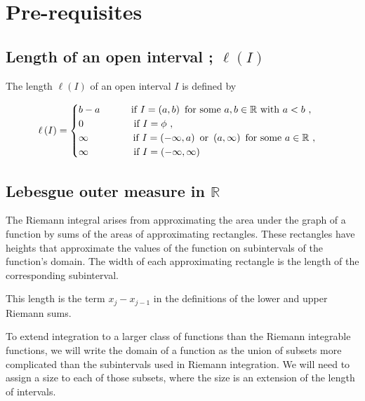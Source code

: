 \documentclass[12pt, a4paper]{article} %
\begin{document}
    \section{Pre-requisites}

       \subsection{Length of an open interval ; $\ell \left(I\right)$}
           The length $\ell\left(I\right)$ of an open interval $I$ is defined by
           
           \begin{equation*}
            \ell\left(I\right) = \begin{cases}
                b-a \hspace*{1cm}\  \mbox{if}\  I = \left(a,b\right)\  \mbox{for some}\  a,b \in \mathbb{R}\ \mbox{with}\  a < b\ ,\\
                0 \hspace*{1.8cm} \mbox{if}\ I = \phi\ ,\\
                \infty \hspace*{1.6cm} \mbox{if}\ I = \left(-\infty, a\right)\ \mbox{or}\ \left(a, \infty\right)\ \mbox{for some}\ a \in \mathbb{R}\ ,\\
                \infty \hspace*{1.5cm}\ \mbox{if}\ I = \left(-\infty, \infty\right)
               \end{cases}
           \end{equation*}

        \subsection{Lebesgue outer measure in $\mathbb
        R$}
            The Riemann integral arises from approximating the area under the graph of a function by sums of the areas of approximating rectangles. These rectangles have heights that approximate the values of the function on subintervals of the function's domain. The width of each approximating rectangle is the length of the corresponding subinterval.

            This length is the term $x_j - x_{j-1}$ in the definitions of the lower and upper Riemann sums.

            To extend integration to a larger class of functions than the Riemann integrable functions, we will write the domain of a function as the union of subsets more
            complicated than the subintervals used in Riemann integration. We will need to assign a size to each of those subsets, where the size is an extension of the length of intervals.
\end{document}
